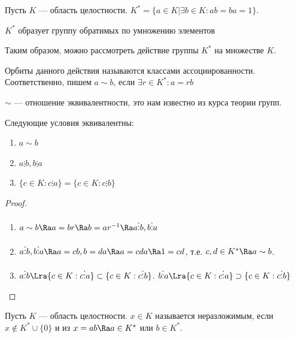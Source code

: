\begin{definition}
    Пусть \(K\) --- область целостности. \(K^* = \{a \in K | \exists b \in K: ab = ba = 1\}\).
\end{definition}

\begin{note}
    \(K^*\) образует группу обратимых по умножению элементов
\end{note}

Таким образом, можно рассмотреть действие группы \(K^*\) на множестве \(K\).
\begin{definition}
    Орбиты данного действия называются классами ассоциированности. Соответственно, пишем \(a \sim b\), если \(\exists r \in K^*: a = rb\)
\end{definition}

\begin{note}
    \(\sim\) --- отношение эквивалентности, это нам известно из курса теории групп.
\end{note}

\begin{proposition}
    Следующие условия эквивалентны:
    \begin{enumerate}
        \item \(a \sim b\)
        \item \(a \vdots b, b \vdots a\)
        \item \(\{c \in K: c \vdots a\} = \{c \in K: c \vdots b\}\)
    \end{enumerate}
\end{proposition}
\begin{proof}\indent
    \begin{enumerate}
        \item[\(1 \Ra 2\)] \(a \sim b \Ra a = br \Ra b = ar^{-1} \Ra a \vdots b, b \vdots a\)
        \item[\(2 \Ra 1\)] \(a \vdots b, b \vdots a \Ra a = cb, b = da \Ra a = cda \Ra 1 = cd\), т.е. \(c, d \in K^* \Ra a \sim b\).
        \item[\(2 \Lra 3\)] \(a \vdots b \Lra \{c \in K: c \vdots a\} \subset \{c \in K: c \vdots b\}\).
        \(b \vdots a \Lra \{c \in K: c \vdots a\} \supset \{c \in K: c \vdots b\}\)
    \end{enumerate}
\end{proof}

\begin{definition}
    Пусть \(K\) --- область целостности. \(x \in K\) называется неразложимым, если \(x \notin K^* \cup \{0\}\) и из \(x = ab \Ra a \in K^*\) или \(b \in K^*\).
\end{definition}

